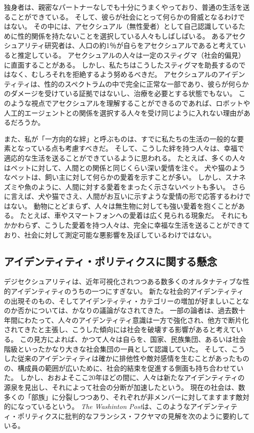 \documentclass[paper=a4,book,openany]{jlreq} \usepackage{mystyle}
\begin{document}
独身者は、親密なパートナーなしでも十分にうまくやっており、普通の生活を送ることができている。
そして、彼らが社会にとって何らかの脅威となるわけではない。
その中には、アセクシュアル（無性愛者）として自己認識しているために性的関係を持たないことを選択している人々もしばしばいる。
あるアセクシュアリティ研究者は、人口の約1％が自らをアセクシュアルであると考えていると推定している\citep{bogaert04:_asexual}。
アセクシュアルの人々は一定のスティグマ（社会的偏見）に直面することがある。
しかし、私たちはこうしたスティグマを助長するのではなく、むしろそれを拒絶するよう努めるべきだ。
アセクシュアルのアイデンティティは、性的のスペクトラムの中で完全に正常な一部であり、彼らが何らかのダメージを受けている証拠ではないし、治療を必要とする状態でもない。
このような視点でアセクシュアルを理解することができるのであれば、ロボットや人工的エージェントとの関係を選択する人々を受け同じように入れない理由があるだろうか。

また、私が「一方向的な絆」と呼ぶものは、すでに私たちの生活の一般的な要素となっている点も考慮すべきだ。
そして、こうした絆を持つ人々は、幸福で適応的な生活を送ることができているように思われる。
たとえば、多くの人々はペットに対して、人間との関係と同じくらい深い愛情を注ぐ。
犬や猫のようなペットは、飼い主に対して何らかの愛着を示すことが多い。
しかし、スナネズミや魚のように、人間に対する愛着をまったく示さないペットも多い。
さらに言えば、犬や猫でさえ、人間がお互いに示すような愛情の形で応答するわけではない。
動物にとどまらず、人々は無生物に対しても強い愛着を抱くことがある。
たとえば、車やスマートフォンへの愛着は広く見られる現象だ。
それにもかかわらず、こうした愛着を持つ人々は、完全に幸福な生活を送ることができており、社会に対して測定可能な悪影響を及ぼしているわけではない。

\subsection{アイデンティティ・ポリティクスに関する懸念}

デジセクシュアリティは、近年可視化されつつある数多くのオルタナティブな性的アイデンティティのうちの一つにすぎない。
新たな社会的アイデンティティの出現そのもの、そしてアイデンティティ・カテゴリーの増加が好ましいことなのか否かについては、かなりの議論がなされてきた。
一部の論者は、過去数十年間にわたって、人々のアイデンティティ意識は一方で強化され、他方で断片化されてきたと主張し、こうした傾向には社会を破壊する影響があると考えている。
この見方によれば、かつて人々は自らを、国家、民族集団、あるいは社会階級といったかなり大きな社会集団の一員として認識していた。
そして、こうした従来のアイデンティティは確かに排他性や敵対感情を生むことがあったものの、構成員の範囲が広いために、社会的結束を促進する側面も持ち合わせていた。
しかし、おおよそここ20年ほどの間に、人々は新たなアイデンティティの源泉を見出し、それによって社会の分断が加速したという。
現在の社会は、数多くの「部族」に分裂しつつあり、それぞれが非メンバーに対してますます敵対的になっているという。
\emph{The Washinton Post}は、このようなアイデンティティ・ポリティクスに批判的なフランシス・フクヤマの見解を次のように要約している。
\end{document}
